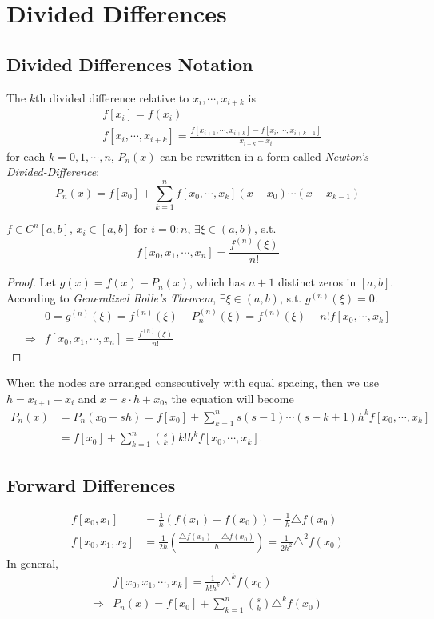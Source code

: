 \section{Divided Differences}
\subsection{Divided Differences Notation}
The $k$th divided difference relative to $x_i,\cdots,x_{i+k}$ is
\begin{align*}
  & f[x_i]=f(x_i) \\
  & f[x_i,\cdots,x_{i+k}]=\frac{f[x_{i+1},\cdots,x_{i+k}]-f[x_i,\cdots,x_{i+k-1}]}{x_{i+k}-x_i}
\end{align*}
for each $k=0,1,\cdots,n$, $P_n(x)$ can be rewritten in a form called \emph{Newton's Divided-Difference}:
\[
P_n(x)=f[x_0]+\sum_{k=1}^{n}f[x_0,\cdots,x_k](x-x_0)\cdots (x-x_{k-1})
\]
\begin{theo}
$f\in C^n[a,b]$, $x_i\in [a,b]$ for $i=0:n$, $\exists\xi\in (a,b)$, s.t.
\[
f[x_0,x_1,\cdots,x_n]=\frac{f^{(n)}(\xi)}{n!}
\]
\end{theo}
\begin{proof}
Let $g(x)=f(x)-P_n(x)$, which has $n+1$ distinct zeros in $[a,b]$. According to \emph{Generalized Rolle's Theorem}, $\exists\xi\in (a,b)$, s.t. $g^{(n)}(\xi)=0$.
\begin{align*}
  & 0=g^{(n)}(\xi)=f^{(n)}(\xi)-P_n^{(n)}(\xi)=f^{(n)}(\xi)-n!f[x_0,\cdots,x_k] \\
  \Rightarrow & f[x_0,x_1,\cdots,x_n]=\frac{f^{(n)}(\xi)}{n!}
\end{align*}
\end{proof}

When the nodes are arranged consecutively with equal spacing, then we use $h=x_{i+1}-x_i$  and $x=s\cdot h+x_0$, the equation will become
\begin{align*}
  P_n(x) &= P_n(x_0+sh)=f[x_0]+\sum_{k=1}^{n}s(s-1)\cdots (s-k+1)h^kf[x_0,\cdots,x_k] \\
  &= f[x_0]+\sum_{k=1}^{n}\binom{s}{k}k!h^kf[x_0,\cdots,x_k].
\end{align*}

\subsection{Forward Differences}
\begin{align*}
  f[x_0,x_1]&=\frac{1}{h}\left(f(x_1)-f(x_0)\right)=\frac{1}{h}\triangle f(x_0) \\
  f[x_0,x_1,x_2]&=\frac{1}{2h}\left(\frac{\triangle f(x_1)-\triangle f(x_0)}{h}\right)=\frac{1}{2h^2}\triangle^2f(x_0)
\end{align*}
In general,
\begin{align*}
  & f[x_0,x_1,\cdots,x_k]=\frac{1}{k!h^k}\triangle^kf(x_0) \\
  \Rightarrow & P_n(x)=f[x_0]+\sum_{k=1}^{n}\binom{s}{k}\triangle^kf(x_0)
\end{align*}
